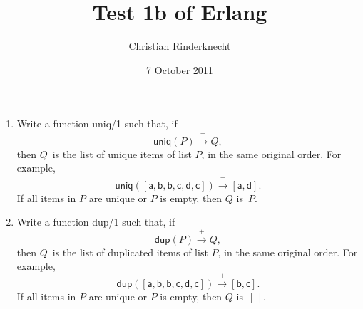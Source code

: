 \documentclass[11pt,a4paper]{article}
\title{Test 1b of \textsf{Erlang}}
\author{Christian Rinderknecht}
\date{7 October 2011}
\newcommand\fun[1]{\textsf{#1}}
\begin{document}
\maketitle

\thispagestyle{empty}

\begin{enumerate}

  \item Write a function \fun{uniq/1} such that, if \[\fun{uniq}(P)
    \xrightarrow{+} Q,\] then \(Q\)~is the list of unique items of
    list \(P\), in the same original order. For example,
    \[\fun{uniq}([\fun{a},\fun{b},\fun{b},\fun{c},\fun{d},\fun{c}])
    \xrightarrow{+} [\fun{a},\fun{d}].\] If all items in \(P\) are
    unique or \(P\) is empty, then \(Q\) is~\(P\).

  \item Write a function \fun{dup/1} such that, if \[\fun{dup}(P)
    \xrightarrow{+} Q,\] then \(Q\)~is the list of duplicated items of
    list \(P\), in the same original order. For example,
    \[\fun{dup}([\fun{a},\fun{b},\fun{b},\fun{c},\fun{d},\fun{c}])
    \xrightarrow{+} [\fun{b},\fun{c}].\] If all items in \(P\) are
    unique or \(P\) is empty, then \(Q\) is~\([\,]\).

\end{enumerate}
\end{document}
